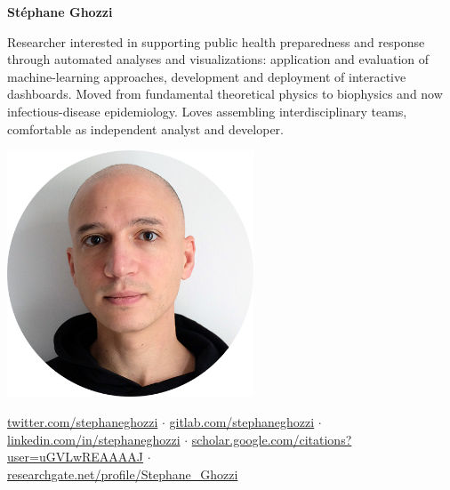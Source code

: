 \documentclass[a4paper,11pt,oneside]{article}
\begin{document}

\noindent\begin{minipage}{0.7\linewidth}
   \LARGE
   \noindent\textbf{Stéphane Ghozzi}

   \normalsize
   \vspace{1.5em}
   \noindent Researcher interested in supporting public health preparedness and response through automated analyses and visualizations: application and evaluation of machine-learning approaches, development and deployment of interactive dashboards. Moved from fundamental theoretical physics to biophysics and now infectious-disease epidemiology. Loves assembling interdisciplinary teams, comfortable as independent analyst and developer. 
\end{minipage}
\begin{minipage}{0.3\linewidth}
   \begin{center}
      \includegraphics[width=0.55\textwidth,right]{GHOZZI-Stephane-portrait-2020-cropped-circle-nobackground-lr.png}
   \end{center}
\end{minipage} 

\vspace{1em}

\href{https://twitter.com/stephaneghozzi}{twitter.com/stephaneghozzi} $\cdot$ \href{https://gitlab.com/stephaneghozzi}{gitlab.com/stephaneghozzi} $\cdot$ \\ \href{https://www.linkedin.com/in/stephaneghozzi}{linkedin.com/in/stephaneghozzi} $\cdot$ \href{https://scholar.google.com/citations?user=uGVLwREAAAAJ}{scholar.google.com/citations?user=uGVLwREAAAAJ} $\cdot$ \\
\href{https://www.researchgate.net/profile/Stephane\_Ghozzi}{researchgate.net/profile/Stephane\_Ghozzi}

\vspace{1em}
\end{document}
